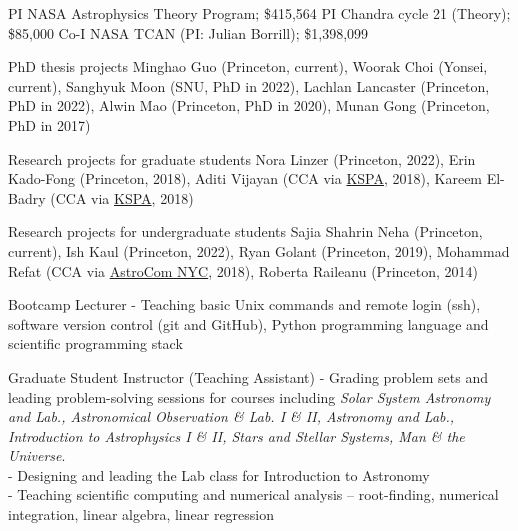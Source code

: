 \documentclass[12pt]{article}
\begin{document}

{PI}
{NASA Astrophysics Theory Program; \$415,564}
{PI}
{Chandra cycle 21 (Theory); \$85,000}
{Co-I}
{NASA TCAN (PI: Julian Borrill); \$1,398,099}



{PhD thesis projects}
{Minghao Guo (Princeton, current), Woorak Choi (Yonsei, current),  Sanghyuk Moon (SNU, PhD in 2022),  Lachlan Lancaster (Princeton, PhD in 2022),  Alwin Mao (Princeton, PhD in 2020),  Munan Gong (Princeton, PhD in 2017)}

{Research projects for graduate students}
{Nora Linzer (Princeton, 2022),  Erin Kado-Fong (Princeton, 2018),  Aditi Vijayan (CCA via \href{https://kspa.soe.ucsc.edu/archives/2018}{KSPA}, 2018),  Kareem El-Badry (CCA via \href{https://kspa.soe.ucsc.edu/archives/2018}{KSPA}, 2018)}

{Research projects for undergraduate students}
{Sajia Shahrin Neha (Princeton, current), Ish Kaul (Princeton, 2022),  Ryan Golant (Princeton, 2019),  Mohammad Refat (CCA via \href{http://cunyastro.org/astrocom/}{AstroCom NYC}, 2018),  Roberta Raileanu (Princeton, 2014)}



{Bootcamp Lecturer}
{- Teaching basic Unix commands and remote login (ssh), software version control (git and GitHub), Python programming language and scientific programming stack}

{Graduate Student Instructor (Teaching Assistant)}
{- Grading problem sets and leading problem-solving sessions for courses including \emph{Solar System Astronomy and Lab., Astronomical Observation \& Lab. I \& II, Astronomy and Lab., Introduction to Astrophysics I \& II, Stars and Stellar Systems, Man \& the Universe}. \\ - Designing and leading the Lab class for Introduction to Astronomy\\- Teaching scientific computing and numerical analysis -- root-finding, numerical integration, linear algebra, linear regression}
\end{document}

